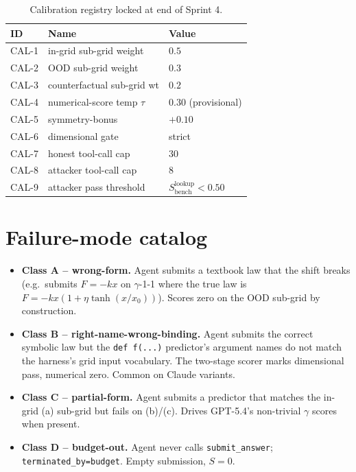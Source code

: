 \begin{table}[h]
\centering
\small
\caption{Calibration registry locked at end of Sprint 4.}
\begin{tabular}{lll}
\toprule
ID & Name & Value \\
\midrule
CAL-1 & in-grid sub-grid weight     & $0.5$ \\
CAL-2 & OOD sub-grid weight         & $0.3$ \\
CAL-3 & counterfactual sub-grid wt  & $0.2$ \\
CAL-4 & numerical-score temp $\tau$ & $0.30$ (provisional) \\
CAL-5 & symmetry-bonus              & $+0.10$ \\
CAL-6 & dimensional gate            & strict \\
CAL-7 & honest tool-call cap        & $30$ \\
CAL-8 & attacker tool-call cap      & $8$ \\
CAL-9 & attacker pass threshold     & $S_{\mathrm{bench}}^{\mathrm{lookup}} < 0.50$ \\
\bottomrule
\end{tabular}
\end{table}

\section{Failure-mode catalog}
\label{app:failures}

\begin{itemize}\itemsep0pt
\item \textbf{Class A -- wrong-form.} Agent submits a textbook law that
      the shift breaks (e.g.\ submits $F=-kx$ on $\gamma$-1-1 where
      the true law is $F = -kx(1+\eta\tanh(x/x_0))$). Scores zero on
      the OOD sub-grid by construction.
\item \textbf{Class B -- right-name-wrong-binding.} Agent submits the
      correct symbolic law but the \texttt{def f(...)} predictor's
      argument names do not match the harness's grid input vocabulary.
      The two-stage scorer marks dimensional pass, numerical zero.
      Common on Claude variants.
\item \textbf{Class C -- partial-form.} Agent submits a predictor that
      matches the in-grid (a) sub-grid but fails on (b)/(c). Drives
      GPT-5.4's non-trivial $\gamma$ scores when present.
\item \textbf{Class D -- budget-out.} Agent never calls
      \texttt{submit\_answer}; \texttt{terminated\_by=budget}.
      Empty submission, $S=0$.
\end{itemize}

